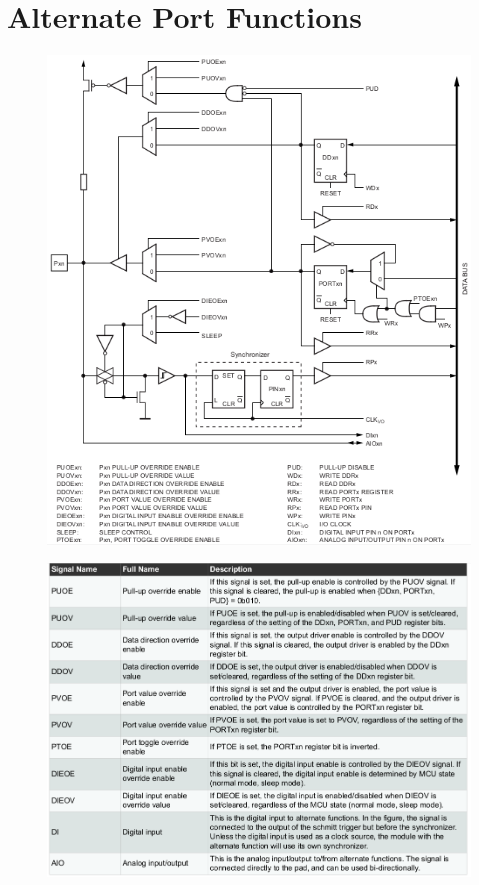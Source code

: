 \documentclass{article}
\begin{document}
\section{Alternate Port Functions}
\begin{figure}[H]
    \begin{center}
        \includegraphics[width=1\textwidth]{IOalternatefunc.png}
    \end{center}
\end{figure}

\begin{figure}[H]
    \begin{center}
        \includegraphics[width=1\textwidth]{IOsignals.png}
    \end{center}
\end{figure}
\end{document}
